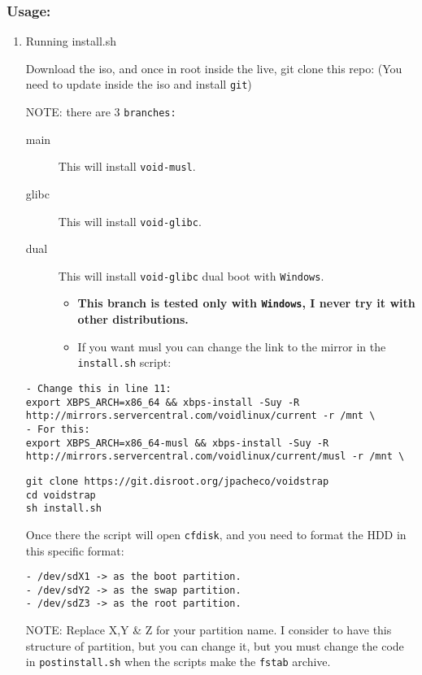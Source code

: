 \documentclass[11pt]{article}
\begin{document}
\subsubsection{Usage:}
\label{sec:org99478ba}

\begin{enumerate}
\item Running install.sh
\label{sec:orgb7c1db3}

Download the iso, and once in root inside the live, git clone this repo:
(You need to update inside the iso and install \texttt{git})

NOTE: there are 3 \texttt{branches:}
\begin{description}
\item[{main}] This will install \texttt{void-musl}.
\item[{glibc}] This will install \texttt{void-glibc}.
\item[{dual}] This will install \texttt{void-glibc} dual boot with \texttt{Windows}.
\begin{itemize}
\item \textbf{This branch is tested only with \texttt{Windows}, I never try it with other distributions.}
\item If you want musl you can change the link to the mirror in the \texttt{install.sh} script:
\end{itemize}
\end{description}
\begin{verbatim}
- Change this in line 11:
export XBPS_ARCH=x86_64 && xbps-install -Suy -R http://mirrors.servercentral.com/voidlinux/current -r /mnt \
- For this:
export XBPS_ARCH=x86_64-musl && xbps-install -Suy -R http://mirrors.servercentral.com/voidlinux/current/musl -r /mnt \
\end{verbatim}

\begin{verbatim}
git clone https://git.disroot.org/jpacheco/voidstrap
cd voidstrap
sh install.sh
\end{verbatim}

Once there the script will open \texttt{cfdisk}, and you need to format the HDD in this 
specific format:
\begin{verbatim}
- /dev/sdX1 -> as the boot partition.
- /dev/sdY2 -> as the swap partition.
- /dev/sdZ3 -> as the root partition.
\end{verbatim}

NOTE: Replace X,Y \& Z for your partition name.
I consider to have this structure of partition, but you can change it, but you must
change the code in \texttt{postinstall.sh} when the scripts make the \texttt{fstab} archive.


\end{enumerate}
\end{document}
